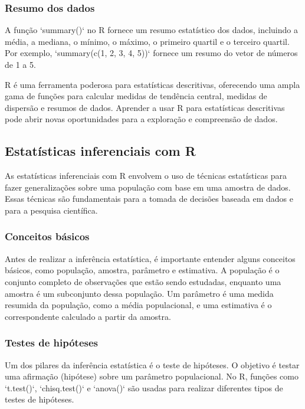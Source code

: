 \documentclass[
]{book}
\begin{document}
\subsubsection{Resumo dos dados}\label{resumo-dos-dados}

A função `summary()` no R fornece um resumo estatístico dos dados, incluindo a média, a mediana, o mínimo, o máximo, o primeiro quartil e o terceiro quartil. Por exemplo, `summary(c(1, 2, 3, 4, 5))` fornece um resumo do vetor de números de 1 a 5.

R é uma ferramenta poderosa para estatísticas descritivas, oferecendo uma ampla gama de funções para calcular medidas de tendência central, medidas de dispersão e resumos de dados. Aprender a usar R para estatísticas descritivas pode abrir novas oportunidades para a exploração e compreensão de dados.

\subsection{Estatísticas inferenciais com R}\label{estatuxedsticas-inferenciais-com-r}

As estatísticas inferenciais com R envolvem o uso de técnicas estatísticas para fazer generalizações sobre uma população com base em uma amostra de dados. Essas técnicas são fundamentais para a tomada de decisões baseada em dados e para a pesquisa científica.

\subsubsection{Conceitos básicos}\label{conceitos-buxe1sicos}

Antes de realizar a inferência estatística, é importante entender alguns conceitos básicos, como população, amostra, parâmetro e estimativa. A população é o conjunto completo de observações que estão sendo estudadas, enquanto uma amostra é um subconjunto dessa população. Um parâmetro é uma medida resumida da população, como a média populacional, e uma estimativa é o correspondente calculado a partir da amostra.

\subsubsection{Testes de hipóteses}\label{testes-de-hipuxf3teses-1}

Um dos pilares da inferência estatística é o teste de hipóteses. O objetivo é testar uma afirmação (hipótese) sobre um parâmetro populacional. No R, funções como `t.test()`, `chisq.test()` e `anova()` são usadas para realizar diferentes tipos de testes de hipóteses.
\end{document}
